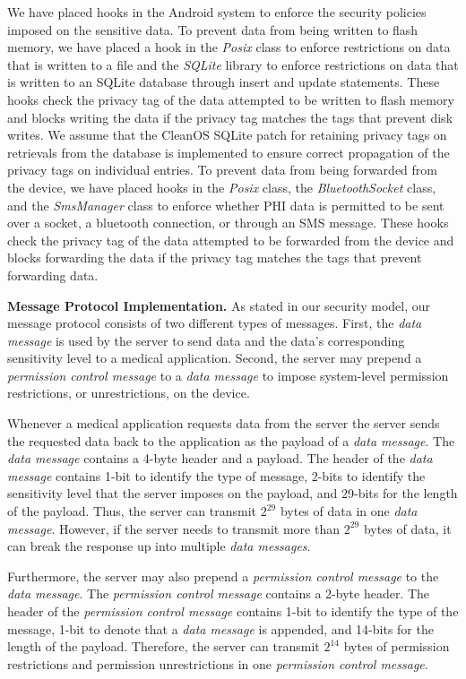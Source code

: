 We have placed hooks in the Android system to enforce the security
policies imposed on the sensitive data.  To prevent data
from being written to flash memory, we have placed a hook in the \textit{Posix}
class to enforce restrictions on data that is written to a file and the
\textit{SQLite} library to enforce restrictions on data that is
written to an SQLite database through insert and update statements.
These hooks check the privacy tag of the data attempted to be written
to flash memory and blocks writing the data if the privacy tag matches
the tags that prevent disk writes.  We assume that the
CleanOS SQLite patch for retaining privacy tags on retrievals
from the database is implemented to ensure correct propagation
of the privacy tags on individual entries.  To prevent data from
being forwarded from the device, we have placed hooks in the \textit{Posix}
class, the \textit{BluetoothSocket} class, and the \textit{SmsManager}
class to enforce whether PHI data is permitted to be sent over
a socket, a bluetooth connection, or through an SMS message.
These hooks check the privacy tag of the data attempted to be forwarded
from the device and blocks forwarding the data if the privacy tag matches
the tags that prevent forwarding data.

\textbf{Message Protocol Implementation.} As stated in our
security model, our message protocol consists of two different
types of messages.  First, the \textit{data message} is
used by the server to send data and the data's corresponding
sensitivity level to a medical application.  Second, the
server may prepend a \textit{permission control message} to a
\textit{data message} to impose system-level permission
restrictions, or unrestrictions, on the device.

Whenever a medical application requests data from the server
the server sends the requested data back to the application
as the payload of a \textit{data message}.  The \textit{data message}
contains a 4-byte header and a payload.  The header of the
\textit{data message} contains 1-bit to identify the type of
message, 2-bits to identify the sensitivity level that the server
imposes on the payload, and  29-bits for the length of the payload.
Thus, the server can transmit $2^{29}$ bytes of data in
one \textit{data message}.  However, if the server needs to transmit
more than $2^{29}$ bytes of data, it can break the response up
into multiple \textit{data messages}.

Furthermore, the server may also prepend a \textit{permission
 control message} to the \textit{data message}.  The
\textit{permission control message} contains a 2-byte header.
The header of the \textit{permission control message} contains
1-bit to identify the type of the message, 1-bit to denote
that a \textit{data message} is appended, and 14-bits for
the length of the payload.  Therefore, the server can
transmit $2^{14}$ bytes of permission restrictions and
permission unrestrictions in one \textit{permission control
 message}.

